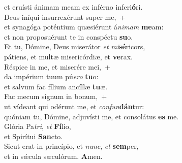 \evenverse et eruísti ánimam meam ex inférno inferi\textbf{ó}ri.\\
\oddverse Deus iníqui insurrexérunt super me,~+\\
\oddverse  et synagóga poténtium quæsiérunt á\textit{ni}\textit{mam} \textbf{me}am:~\*\\
\oddverse et non proposuérunt te in conspéctu \textbf{su}o.\\
\evenverse Et tu, Dómine, Deus miserátor \textit{et} \textit{mi}\textbf{sé}ricors,~\*\\
\evenverse pátiens, et multæ misericórdiæ, et \textbf{ve}rax.\\
\oddverse Réspice in me, et miserére mei,~+\\
\oddverse  da impérium tuum pú\textit{e}\textit{ro} \textbf{tu}o:~\*\\
\oddverse et salvum fac fílium ancíllæ \textbf{tu}æ.\\
\evenverse Fac mecum signum in bonum,~+\\
\evenverse  ut vídeant qui odérunt me, et \textit{con}\textit{fun}\textbf{dán}tur:~\*\\
\evenverse quóniam tu, Dómine, adjuvísti me, et consolátus \textbf{es} me.\\
\oddverse Glória Pa\textit{tri}, \textit{et} \textbf{Fí}lio,~\*\\
\oddverse et Spirítui \textbf{San}cto.\\
\evenverse Sicut erat in princípio, et \textit{nunc}, \textit{et} \textbf{sem}per,~\*\\
\evenverse et in sǽcula sæculórum. \textbf{A}men.\\
